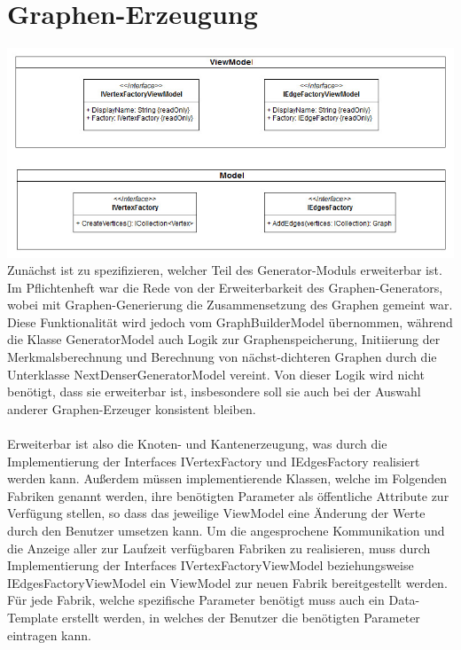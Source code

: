 \documentclass[13pt]{scrreprt}
\begin{document}
\section{Graphen-Erzeugung}
\includegraphics[scale = 0.5,center]{GeneratorExpandability.jpg}
Zunächst ist zu spezifizieren, welcher Teil des Generator-Moduls erweiterbar ist. Im Pflichtenheft war die Rede von der Erweiterbarkeit des Graphen-Generators, wobei mit Graphen-Generierung die Zusammensetzung des Graphen gemeint war. Diese Funktionalität wird jedoch vom GraphBuilderModel übernommen, während die Klasse GeneratorModel auch Logik zur Graphenspeicherung, Initiierung der Merkmalsberechnung und Berechnung von nächst-dichteren Graphen durch die Unterklasse NextDenserGeneratorModel vereint. Von dieser Logik wird nicht benötigt, dass sie erweiterbar ist, insbesondere soll sie auch bei der Auswahl anderer Graphen-Erzeuger konsistent bleiben. \\ \\
Erweiterbar ist also die Knoten- und Kantenerzeugung, was durch die Implementierung der Interfaces IVertexFactory und IEdgesFactory realisiert werden kann. Außerdem müssen implementierende Klassen, welche im Folgenden Fabriken genannt werden, ihre benötigten Parameter
als öffentliche Attribute zur Verfügung stellen, so dass das jeweilige ViewModel eine Änderung der Werte durch den Benutzer umsetzen kann. Um die angesprochene Kommunikation und die Anzeige aller zur Laufzeit verfügbaren Fabriken zu realisieren, muss durch Implementierung der Interfaces IVertexFactoryViewModel beziehungsweise IEdgesFactoryViewModel ein ViewModel zur neuen Fabrik bereitgestellt werden. Für jede Fabrik, welche spezifische Parameter benötigt muss auch ein Data-Template erstellt werden, in welches der Benutzer die benötigten Parameter eintragen kann.
\end{document}
